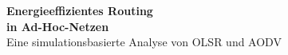\begin{titlepage}
\sffamily
\vspace*{3cm}
\begin{center}
\LARGE{\textbf{Energieeffizientes Routing \\in Ad-Hoc-Netzen}}\\
\vspace*{0.25cm}
\normalsize Eine simulationsbasierte Analyse von OLSR und AODV
\end{center}
\end{titlepage}
\thispagestyle{empty}
